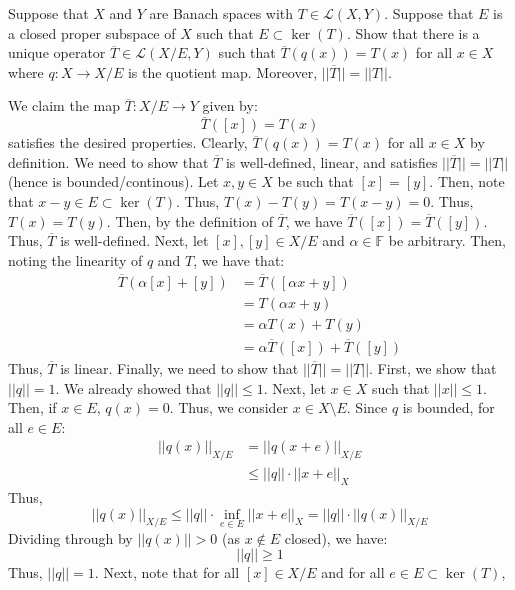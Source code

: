 \documentclass[12pt]{article}
\begin{document}
\begin{problem}{31}
    Suppose that $X$ and $Y$ are Banach spaces with $T \in \mathcal{L}(X, Y)$. Suppose that $E$ is a closed proper subspace of $X$ such that $E \subset \ker(T)$. Show that there is a unique operator $\overline{T} \in \mathcal{L}(X/E, Y)$ such that $\overline{T}(q(x)) = T(x)$ for all $x \in X$ where $q: X \to X/E$ is the quotient map. Moreover, $||\overline{T}|| = ||T||$.
\end{problem}
\begin{solution} 
    We claim the map $\overline{T}: X/E \to Y$ given by: 
    \[ \overline{T}([x]) = T(x)\]
    satisfies the desired properties. Clearly, $\overline{T}(q(x)) = T(x)$ for all $x \in X$ by definition. We need to show that $\overline{T}$ is well-defined, linear, and satisfies $||\overline{T}|| = ||T||$ (hence is bounded/continous). \bbni
    Let $x, y \in X$ be such that $[x] = [y]$. Then, note that $x - y \in E \subset \ker(T)$. Thus, $T(x)-T(y) = T(x-y) = 0$. Thus, $T(x) = T(y)$. Then, by the definition of $\overline{T}$, we have $\overline{T}([x]) = \overline{T}([y])$. Thus, $\overline{T}$ is well-defined. \bbni
    Next, let $[x], [y] \in X/E$ and $\alpha \in \mathbb{F}$ be arbitrary. Then, noting the linearity of $q$ and $T$, we have that:
    \begin{align*}
        \overline{T}(\alpha[x] + [y]) &= \overline{T}([\alpha x + y]) \\
        &= T(\alpha x + y) \\
        &= \alpha T(x) + T(y) \\
        &= \alpha \overline{T}([x]) + \overline{T}([y])
    \end{align*}
    Thus, $\overline{T}$ is linear. \bbni
    Finally, we need to show that $||\overline{T}|| = ||T||$. First, we show that $||q|| = 1$. We already showed that $||q|| \leq 1$. Next, let $x \in X$ such that $||x||\leq 1$. Then, if $x \in E$, $q(x) = 0$. Thus, we consider $x \in X\setminus E$. Since $q$ is bounded, for all $e \in E$: 
    \begin{align*}
        ||q(x)||_{X/E} &= ||q(x+e)||_{X/E} \\
        &\leq ||q|| \cdot ||x+e||_{X}
    \end{align*}
    Thus,
    \[ ||q(x)||_{X/E} \leq ||q|| \cdot \inf_{e\in E} ||x+e||_X = ||q|| \cdot ||q(x)||_{X/E} \]
    Dividing through by $||q(x)|| > 0$ (as $x \not \in E$ closed), we have:
    \[ ||q|| \geq 1\]
    Thus, $||q|| = 1$. Next, note that for all $[x] \in X/E$ and for all  $e \in E \subset \ker(T)$,

\end{solution}
\end{document}
